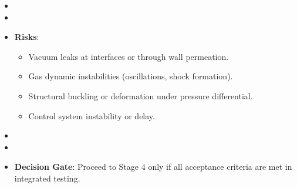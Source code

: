 \begin{itemize}
\begin{enumerate}
        \end{enumerate}
    \item \item \item \textbf{Risks}:
        \begin{itemize}
            \item Vacuum leaks at interfaces or through wall permeation.
            \item Gas dynamic instabilities (oscillations, shock formation).
            \item Structural buckling or deformation under pressure differential.
            \item Control system instability or delay.
        \end{itemize}
    \item \item \item \textbf{Decision Gate}: Proceed to Stage 4 only if all acceptance criteria are met in integrated testing.
\end{itemize}

